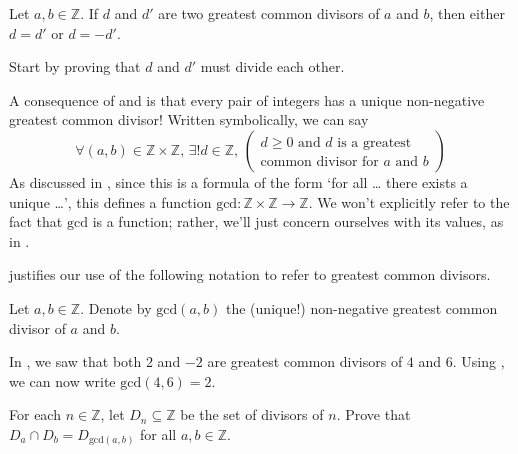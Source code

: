 \begin{exercise}
\label{exGCDUnique}
Let $a,b \in \mathbb{Z}$. If $d$ and $d'$ are two greatest common divisors of $a$ and $b$, then either $d=d'$ or $d=-d'$.
\begin{backhint}
Start by proving that $d$ and $d'$ must divide each other.
\end{backhint}
\end{exercise}

\begin{aside}
A consequence of  and  is that every pair of integers has a unique non-negative greatest common divisor! Written symbolically, we can say
\[ \forall (a,b) \in \mathbb{Z} \times \mathbb{Z},\, \exists ! d \in \mathbb{Z},\, \begin{pmatrix} d \ge 0 \text{ and } d \text{ is a greatest} \\ \text{common divisor for $a$ and $b$} \end{pmatrix} \]
As discussed in , since this is a formula of the form `for all \dots{} there exists a unique \dots{}', this defines a function $\mathrm{gcd} : \mathbb{Z} \times \mathbb{Z} \to \mathbb{Z}$. We won't explicitly refer to the fact that $\mathrm{gcd}$ is a function; rather, we'll just concern ourselves with its values, as in .
\end{aside}

 justifies our use of the following notation to refer to greatest common divisors.

\begin{notation}
\label{ntnGCDFunction}
Let $a,b \in \mathbb{Z}$. Denote by $\mathrm{gcd}(a,b)$  the (unique!) non-negative greatest common divisor of $a$ and $b$.
\end{notation}

\begin{example}
In , we saw that both $2$ and $-2$ are greatest common divisors of $4$ and $6$. Using , we can now write $\mathrm{gcd}(4,6)=2$.
\end{example}

\begin{exercise}
For each $n \in \mathbb{Z}$, let $D_n \subseteq \mathbb{Z}$ be the set of divisors of $n$. Prove that $D_a \cap D_b = D_{\mathrm{gcd}(a,b)}$ for all $a,b \in \mathbb{Z}$.
\end{exercise}

